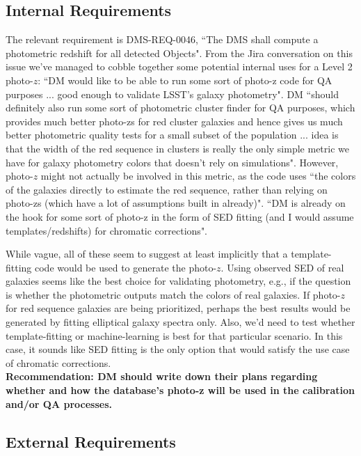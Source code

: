 \documentclass[DM,lsstdraft,toc]{lsstdoc}
\begin{document}
\subsection{Internal Requirements}\label{ssec:motivation_internal}

The relevant requirement is DMS-REQ-0046, ``The DMS shall compute a photometric redshift for all detected Objects". From the Jira conversation on this issue we've managed to cobble together some potential internal uses for a Level 2 photo-$z$: 
 ``DM would like to be able to run some sort of photo-z code for QA purposes ... good enough to validate LSST's galaxy photometry".
 DM ``should definitely also run some sort of photometric cluster finder for QA purposes, which provides much better photo-zs for red cluster galaxies and hence gives us much better photometric quality tests for a small subset of the population ... idea is that the width of the red sequence in clusters is really the only simple metric we have for galaxy photometry colors that doesn't rely on simulations". However, photo-$z$ might not actually be involved in this metric, as the code uses ``the colors of the galaxies directly to estimate the red sequence, rather than relying on photo-zs (which have a lot of assumptions built in already)".
 ``DM is already on the hook for some sort of photo-z in the form of SED fitting (and I would assume templates/redshifts) for chromatic corrections".

While vague, all of these seem to suggest at least implicitly that a template-fitting code would be used to generate the photo-$z$. 
 Using observed SED of real galaxies seems like the best choice for validating photometry, e.g., if the question is whether the photometric outputs match the colors of real galaxies. 
 If photo-$z$ for red sequence galaxies are being prioritized, perhaps the best results would be generated by fitting elliptical galaxy spectra only. Also, we'd need to test whether template-fitting or machine-learning is best for that particular scenario. 
 In this case, it sounds like SED fitting is the only option that would satisfy the use case of chromatic corrections. \\
\textbf{Recommendation: DM should write down their plans regarding whether and how the database's photo-z will be used in the calibration and/or QA processes.}

\subsection{External Requirements}\label{ssec:motivation_external}
\end{document}
